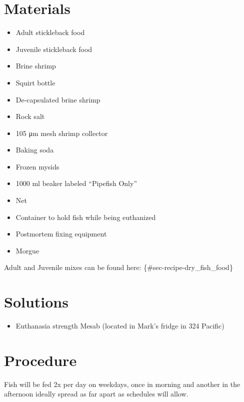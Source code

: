 \documentclass[
  letterpaper,
  DIV=11,
  numbers=noendperiod]{scrreprt}
\providecommand{\tightlist}{%
  \setlength{\itemsep}{0pt}\setlength{\parskip}{0pt}}\usepackage{longtable,booktabs,array}
\begin{document}
\hypertarget{materials-15}{%
\section{Materials}\label{materials-15}}

\begin{itemize}
\tightlist
\item
  Adult stickleback food
\item
  Juvenile stickleback food
\item
  Brine shrimp
\item
  Squirt bottle
\item
  De-capsulated brine shrimp
\item
  Rock salt
\item
  105 μm mesh shrimp collector
\item
  Baking soda
\item
  Frozen mysids
\item
  1000 ml beaker labeled ``Pipefish Only''
\item
  Net
\item
  Container to hold fish while being euthanized
\item
  Postmortem fixing equipment
\item
  Morgue
\end{itemize}

Adult and Juvenile mixes can be found here:
\{\#sec-recipe-dry\_fish\_food\}

\hypertarget{solutions-12}{%
\section{Solutions}\label{solutions-12}}

\begin{itemize}
\tightlist
\item
  Euthanasia strength Mesab (located in Mark's fridge in 324 Pacific)
\end{itemize}

\hypertarget{procedure-17}{%
\section{Procedure}\label{procedure-17}}

\begin{tcolorbox}[enhanced jigsaw, bottomtitle=1mm, rightrule=.15mm, toptitle=1mm, opacitybacktitle=0.6, bottomrule=.15mm, titlerule=0mm, coltitle=black, leftrule=.75mm, arc=.35mm, colback=white, colframe=quarto-callout-warning-color-frame, left=2mm, colbacktitle=quarto-callout-warning-color!10!white, title=\textcolor{quarto-callout-warning-color}{\faExclamationTriangle}\hspace{0.5em}{NOTES}, toprule=.15mm, opacityback=0, breakable]

Fish will be fed 2x per day on weekdays, once in morning and another in
the afternoon ideally spread as far apart as schedules will allow.

\end{tcolorbox}
\end{document}
